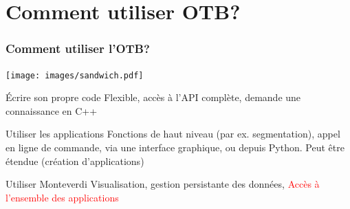 \documentclass[8pt]{beamer}
\begin{document}
\section{Comment utiliser OTB?}

\begin{frame}
\frametitle{Comment utiliser l'OTB?}
\vspace{-0.5cm}
\begin{center}
\texttt{[image: images/sandwich.pdf]}
\end{center}
\vspace{-0.5cm}
\begin{block}{Écrire son propre code}
 Flexible, accès à l'API complète, demande une connaissance en C++
\end{block}
\begin{block}{Utiliser les applications}
 Fonctions de haut niveau (par ex. segmentation), appel en ligne de commande, via une interface graphique, ou depuis Python. Peut être étendue (création d'applications)
\end{block}
\begin{block}{Utiliser Monteverdi}
Visualisation, gestion persistante des données, \textcolor{red}{Accès à l'ensemble des applications}
\end{block}
\end{frame}
\end{document}
